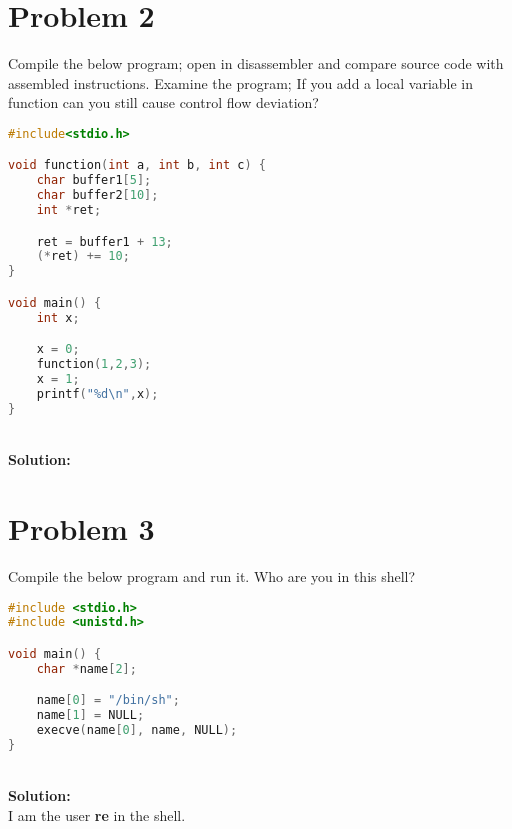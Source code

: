 \documentclass[10.9pt]{article}
\newcommand\tab[1][0.5cm]{\hspace*{#1}}
\begin{document}
\section{Problem 2}
\tab Compile the below program; open in disassembler and compare source code with assembled
instructions. Examine the program; If you add a local variable in function can you still cause
control flow deviation?



\begin{lstlisting}[language=C]
#include<stdio.h>

void function(int a, int b, int c) {
	char buffer1[5];
	char buffer2[10];
	int *ret;

	ret = buffer1 + 13;
	(*ret) += 10;
}

void main() {
	int x;

	x = 0;
	function(1,2,3);
	x = 1;
	printf("%d\n",x);
}
\end{lstlisting}
\textbf{\\Solution:\\}


\section{Problem 3}
\tab Compile the below program and run it. Who are you in this shell?
\begin{lstlisting}[language=C]
#include <stdio.h>
#include <unistd.h>

void main() {
	char *name[2];

	name[0] = "/bin/sh";
	name[1] = NULL;
	execve(name[0], name, NULL);
}
\end{lstlisting}
\textbf{\\Solution:\\}
I am the user \textbf{re} in the shell. 
\end{document}
